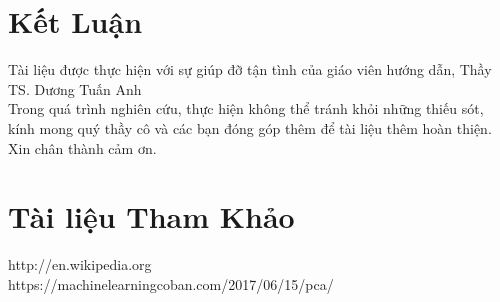 \documentclass{hcmutarticle}
\begin{document}
\section{Kết Luận }\label{result}
Tài liệu được thực hiện  với sự giúp đỡ tận tình của giáo viên hướng dẫn, Thầy TS. Dương Tuấn Anh\\
Trong quá trình nghiên cứu, thực hiện không thể tránh khỏi những  thiếu sót, kính mong quý thầy  cô và các bạn đóng góp thêm để tài liệu thêm hoàn thiện.\\
Xin chân thành cảm ơn.


\section{Tài liệu Tham Khảo }




http://en.wikipedia.org\\
https://machinelearningcoban.com/2017/06/15/pca/ \\

\end{document}
